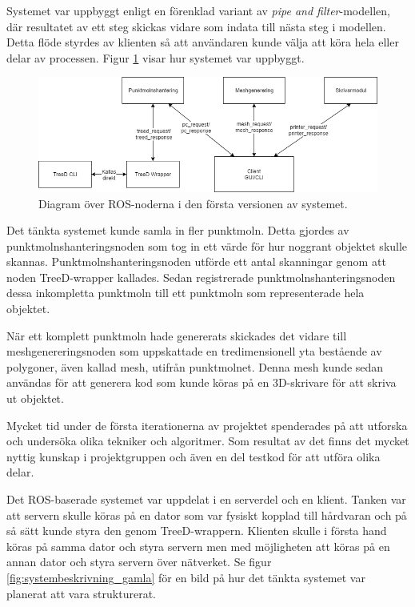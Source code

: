 Systemet var uppbyggt enligt en förenklad variant av \textit{pipe and filter}-modellen, där resultatet av ett steg skickas vidare som indata till nästa steg i modellen. Detta flöde styrdes av klienten så att användaren kunde välja att köra hela eller delar av processen. Figur \ref{fig:noddiagram} visar hur systemet var uppbyggt.

\begin{figure}[H]
	\centering
	\includegraphics[width=130mm]{figures/Noddiagram.png}
	\caption{Diagram över ROS-noderna i den första versionen av systemet.}
	\label{fig:noddiagram}
\end{figure}

Det tänkta systemet kunde samla in fler punktmoln. Detta gjordes av punktmolnshanteringsnoden som tog in ett värde för hur noggrant objektet skulle skannas. Punktmolnshanteringsnoden utförde ett antal skanningar genom att noden TreeD-wrapper kallades. Sedan registrerade punktmolnshanteringsnoden dessa inkompletta punktmoln till ett punktmoln som representerade hela objektet.

När ett komplett punktmoln hade genererats skickades det vidare till meshgenereringsnoden som uppskattade en tredimensionell yta bestående av polygoner, även kallad mesh, utifrån punktmolnet. Denna mesh kunde sedan användas för att generera kod som kunde köras på en 3D-skrivare för att skriva ut objektet.

Mycket tid under de första iterationerna av projektet spenderades på att utforska och undersöka olika tekniker och algoritmer. Som resultat av det finns det mycket nyttig kunskap i projektgruppen och även en del testkod för att utföra olika delar.

Det ROS-baserade systemet var uppdelat i en serverdel och en klient. Tanken var att servern skulle köras på en dator som var fysiskt kopplad till hårdvaran och på så sätt kunde styra den genom TreeD-wrappern. Klienten skulle i första hand köras på samma dator och styra servern men med möjligheten att köras på en annan dator och styra servern över nätverket. Se figur \ref{fig:systembeskrivning_gamla} för en bild på hur det tänkta systemet var planerat att vara strukturerat.

